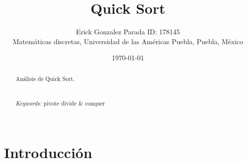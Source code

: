\documentclass{article}
\begin{document}
\renewcommand{\footrulewidth}{1pt}
\renewcommand{\tablename}{Tabla}
\renewcommand{\figurename}{Figura}


\title{Quick Sort}
\author{\small{Erick Gonzalez Parada ID: 178145}\\
	   \small{Matemáticas discretas, Universidad de las Américas Puebla, Puebla, M\'exico}}
\date{\small{\today}}
\maketitle

\begin{abstract}
Análisis de Quick Sort.\\
\\
\\
{\it Keywords:}   pivote divide \& conquer   
\\
\\
\end{abstract}

\section{Introducción}\label{Introducción}                              	%
\end{document}
